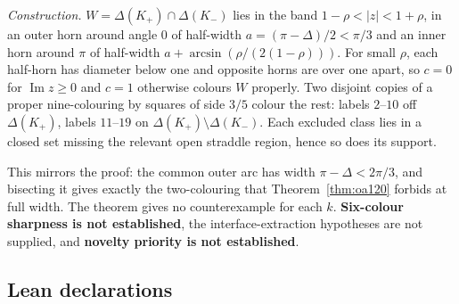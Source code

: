 \documentclass[11pt]{article}
\theoremstyle{definition}
\theoremstyle{remark}
\begin{document}
\emph{Construction.} $W=\Delta(K_+)\cap\Delta(K_-)$ lies in the band
$1-\rho<|z|<1+\rho$, in an outer horn around angle $0$ of half-width
$a=(\pi-\Delta)/2<\pi/3$ and an inner horn around $\pi$ of half-width
$a+\arcsin(\rho/(2(1-\rho)))$. For small $\rho$, each half-horn has diameter
below one and opposite horns are over one apart, so $c=0$ for
$\operatorname{Im}z\ge0$ and $c=1$ otherwise colours $W$ properly. Two
disjoint copies of a proper nine-colouring by squares of side $3/5$ colour
the rest: labels $2$--$10$ off $\Delta(K_+)$, labels $11$--$19$ on
$\Delta(K_+)\setminus\Delta(K_-)$. Each excluded class lies in a closed set
missing the relevant open straddle region, hence so does its support.

This mirrors the proof: the common outer arc has width $\pi-\Delta<2\pi/3$,
and bisecting it gives exactly the two-colouring that
Theorem~\ref{thm:oa120} forbids at full width. The theorem gives no
counterexample for each $k$. \textbf{Six-colour sharpness is not
established}, the interface-extraction hypotheses are not supplied, and
\textbf{novelty priority is not established}.

\subsection{Lean declarations}
\end{document}
